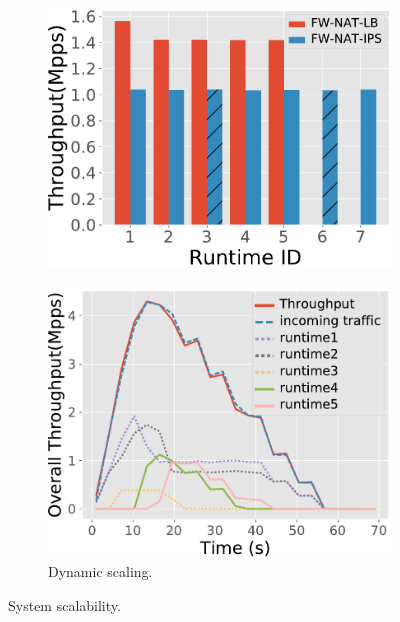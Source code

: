 \begin{figure}[!h]
\begin{subfigure}[t]{0.49\linewidth}
   \caption{}\label{fig:throughput_latency_cdf}
  \end{subfigure}\hfill
  \begin{subfigure}[t]{0.49\linewidth}
   \centering
   \includegraphics[width=\columnwidth]{chap-nfvactor/exp-figure/throughput_2sc.pdf}
   \caption{}\label{fig:throughput_2sc}
  \end{subfigure}
  \begin{subfigure}[t]{0.49\linewidth}
    \centering
    \includegraphics[width=\columnwidth]{chap-nfvactor/figure/Scale.pdf}
    \caption{Dynamic scaling.}\label{fig:scale}
  \end{subfigure}\hfill
\caption{System scalability.}
\end{figure}

